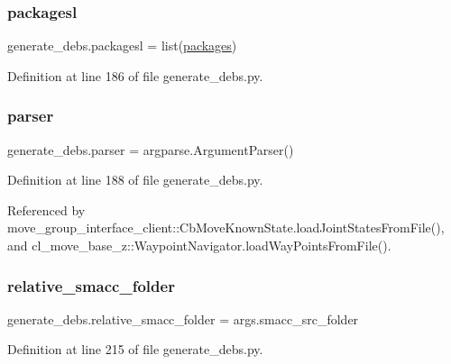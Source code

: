 \subsubsection{\texorpdfstring{packagesl}{packagesl}}
{\footnotesize\ttfamily generate\+\_\+debs.\+packagesl = list(\hyperlink{namespacegenerate__debs_a40d4732827c5678f3f48354238245e1d}{packages})}



Definition at line 186 of file generate\+\_\+debs.\+py.

\mbox{\label{namespacegenerate__debs_a4a9ae4bb85fc62d7973ea3d09ced6c26}} 
\subsubsection{\texorpdfstring{parser}{parser}}
{\footnotesize\ttfamily generate\+\_\+debs.\+parser = argparse.\+Argument\+Parser()}



Definition at line 188 of file generate\+\_\+debs.\+py.



Referenced by move\+\_\+group\+\_\+interface\+\_\+client\+::\+Cb\+Move\+Known\+State.\+load\+Joint\+States\+From\+File(), and cl\+\_\+move\+\_\+base\+\_\+z\+::\+Waypoint\+Navigator.\+load\+Way\+Points\+From\+File().

\mbox{\label{namespacegenerate__debs_abf6925bd06ac1da3981fe638eefb5a61}} 
\subsubsection{\texorpdfstring{relative\+\_\+smacc\+\_\+folder}{relative\_smacc\_folder}}
{\footnotesize\ttfamily generate\+\_\+debs.\+relative\+\_\+smacc\+\_\+folder = args.\+smacc\+\_\+src\+\_\+folder}



Definition at line 215 of file generate\+\_\+debs.\+py.

\mbox{\label{namespacegenerate__debs_a74472455382c9d55ee0d75c6df6bde74}} 
